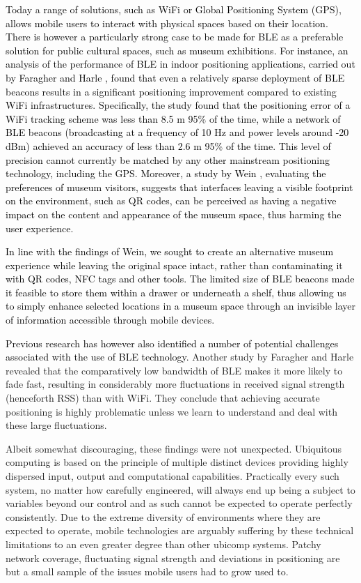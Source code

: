 \documentclass[prodmode,acmtomm]{acmsmall}
\begin{document}
\textcolor{black}{Today a range of solutions, such as WiFi or Global Positioning System (GPS), allows mobile users to interact with physical spaces based on their location. There is however a particularly strong case to be made for BLE as a preferable solution for public cultural spaces, such as museum exhibitions. For instance, an analysis of the performance of BLE in indoor positioning applications, carried out by Faragher and Harle \cite{Faragher2014b}, found that even a relatively sparse deployment of BLE beacons results in a significant positioning improvement compared to existing WiFi infrastructures. Specifically, the study found that the positioning error of a WiFi tracking scheme was less than 8.5 m 95\% of the time, while a network of BLE beacons (broadcasting at a frequency of 10 Hz and power levels around -20 dBm) achieved an accuracy of less than 2.6 m 95\% of the time. This level of precision cannot currently be matched by any other mainstream positioning technology, including the GPS. \cite{Sterling2014} Moreover, a study by Wein \cite{wein2014}, evaluating the preferences of museum visitors, suggests that interfaces leaving a visible footprint on the environment, such as QR codes, can be perceived as having a negative impact on the content and appearance of the museum space, thus harming the user experience.}

\textcolor{black}{In line with the findings of Wein, we sought to create an alternative museum experience while leaving the original space intact, rather than contaminating it with QR codes, NFC tags and other tools. The limited size of BLE beacons made it feasible to store them within a drawer or underneath a shelf, thus allowing us to simply enhance selected locations in a museum space through an invisible layer of information accessible through mobile devices.}

\textcolor{black}{Previous research has however also identified a number of potential challenges associated with the use of BLE technology.} Another study by Faragher and Harle \cite{faragher2015} revealed that the comparatively low bandwidth of BLE makes it more likely to fade fast, resulting in considerably more fluctuations in received signal strength (henceforth RSS) than with WiFi. They conclude that achieving accurate positioning is highly problematic unless we learn to understand and deal with these large fluctuations. 

Albeit somewhat discouraging, these findings were not unexpected. Ubiquitous computing is based on the principle of multiple distinct devices providing highly dispersed input, output and computational capabilities. Practically every such system, no matter how carefully engineered, will always end up being a subject to variables beyond our control and as such cannot be expected to operate perfectly consistently. Due to the extreme diversity of environments where they are expected to operate, mobile technologies are arguably suffering by these technical limitations to an even greater degree than other ubicomp systems. Patchy network coverage, fluctuating signal strength and deviations in positioning are but a small sample of the issues mobile users had to grow used to. 
\end{document}
